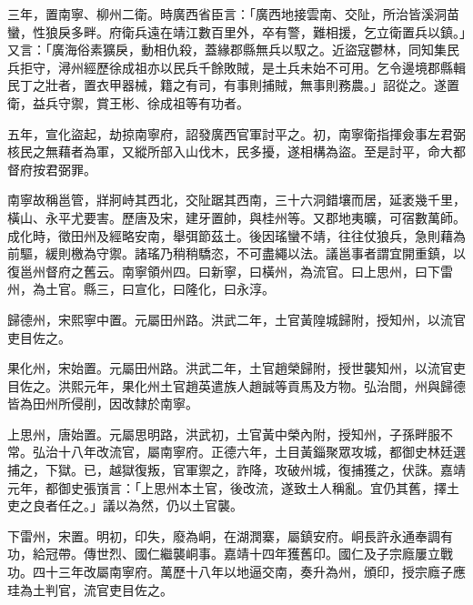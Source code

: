 \begin{pinyinscope}
三年，置南寧、柳州二衛。時廣西省臣言：「廣西地接雲南、交阯，所治皆溪洞苗蠻，性狼戾多畔。府衛兵遠在靖江數百里外，卒有警，難相援，乞立衛置兵以鎮。」又言：「廣海俗素獷戾，動相仇殺，蓋緣郡縣無兵以馭之。近盜寇鬱林，同知集民兵拒守，潯州經歷徐成祖亦以民兵千餘敗賊，是土兵未始不可用。乞令邊境郡縣輯民丁之壯者，置衣甲器械，籍之有司，有事則捕賊，無事則務農。」詔從之。遂置衛，益兵守禦，賞王彬、徐成祖等有功者。

五年，宣化盜起，劫掠南寧府，詔發廣西官軍討平之。初，南寧衛指揮僉事左君弼核民之無藉者為軍，又縱所部入山伐木，民多擾，遂相構為盜。至是討平，命大都督府按君弼罪。

南寧故稱邕管，牂牁峙其西北，交阯踞其西南，三十六洞錯壤而居，延袤幾千里，橫山、永平尤要害。歷唐及宋，建牙置帥，與桂州等。又郡地夷曠，可宿數萬師。成化時，徵田州及經略安南，舉弭節茲土。後因瑤蠻不靖，往往仗狼兵，急則藉為前驅，緩則檄為守禦。諸瑤乃稍稍驕恣，不可盡繩以法。議邕事者謂宜開重鎮，以復邕州督府之舊云。南寧領州四。曰新寧，曰橫州，為流官。曰上思州，曰下雷州，為土官。縣三，曰宣化，曰隆化，曰永淳。

歸德州，宋熙寧中置。元屬田州路。洪武二年，土官黃隍城歸附，授知州，以流官吏目佐之。

果化州，宋始置。元屬田州路。洪武二年，土官趙榮歸附，授世襲知州，以流官吏目佐之。洪熙元年，果化州土官趙英遣族人趙誠等貢馬及方物。弘治間，州與歸德皆為田州所侵削，因改隸於南寧。

上思州，唐始置。元屬思明路，洪武初，土官黃中榮內附，授知州，子孫畔服不常。弘治十八年改流官，屬南寧府。正德六年，土目黃錙聚眾攻城，都御史林廷選捕之，下獄。已，越獄復叛，官軍禦之，詐降，攻破州城，復捕獲之，伏誅。嘉靖元年，都御史張嵿言：「上思州本土官，後改流，遂致土人稱亂。宜仍其舊，擇土吏之良者任之。」議以為然，仍以土官襲。

下雷州，宋置。明初，印失，廢為峒，在湖潤寨，屬鎮安府。峒長許永通奉調有功，給冠帶。傳世烈、國仁繼襲峒事。嘉靖十四年獲舊印。國仁及子宗廕屢立戰功。四十三年改屬南寧府。萬歷十八年以地逼交南，奏升為州，頒印，授宗廕子應珪為土判官，流官吏目佐之。


\end{pinyinscope}